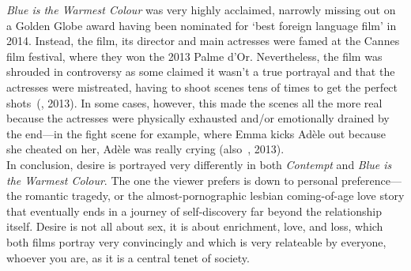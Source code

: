 \documentclass[12pt,a4paper]{article}
\begin{document}
\textit{Blue is the Warmest Colour} was very highly acclaimed,
narrowly missing out on a Golden Globe award having been nominated for
`best foreign language film' in 2014. Instead, the film, its director
and main actresses were famed at the Cannes film festival, where they
won the 2013 Palme d'Or\nocite{palme-dor}. Nevertheless, the film
was shrouded in controversy as some claimed it wasn't a true portrayal
and that the actresses were mistreated, having to shoot scenes
tens of times to get the perfect shots~(\citeauthor{reshoot-scenes},
2013). In some cases, however, this made the scenes all the more real
because the actresses were physically exhausted and\slash or
emotionally drained by the end---in the fight scene for example, where
Emma kicks Adèle out because she cheated on her, Adèle was really
crying (also~\citeauthor{reshoot-scenes}, 2013).\\

In conclusion, desire is portrayed very differently in both
\textit{Contempt} and \textit{Blue is the Warmest Colour}. The one the
viewer prefers is down to personal preference---the romantic tragedy,
or the almost-pornographic lesbian coming-of-age love story that
eventually ends in a journey of self-discovery far beyond the
relationship itself. Desire is not all about sex, it is about
enrichment, love, and loss, which both films portray very convincingly
and which is very relateable by everyone, whoever you are, as it is a
central tenet of society.



\end{document}
